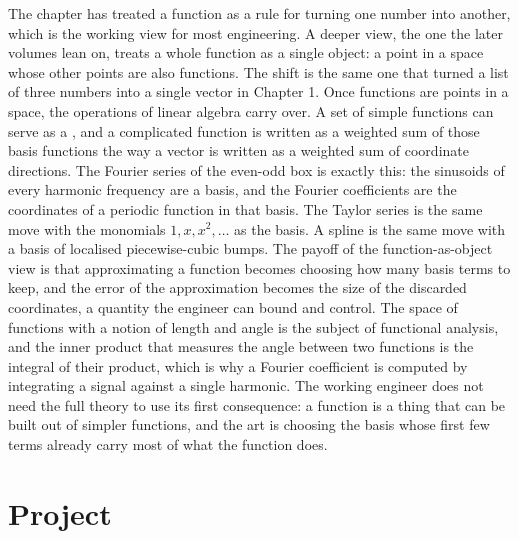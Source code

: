 \begin{mastery}
The chapter has treated a function as a rule for turning one number
into another, which is the working view for most engineering. A deeper
view, the one the later volumes lean on, treats a whole function as a
single object: a point in a space whose other points are also
functions. The shift is the same one that turned a list of three
numbers into a single vector in Chapter 1. Once functions are points
in a space, the operations of linear algebra carry over. A set of
simple functions can serve as a , and a complicated
function is written as a weighted sum of those basis functions the way
a vector is written as a weighted sum of coordinate directions. The
Fourier series of the even-odd box is exactly this: the sinusoids of
every harmonic frequency are a basis, and the Fourier coefficients are
the coordinates of a periodic function in that basis. The Taylor series
is the same move with the monomials $1, x, x^{2}, \ldots$ as the basis.
A spline is the same move with a basis of localised piecewise-cubic
bumps. The payoff of the function-as-object view is that approximating
a function becomes choosing how many basis terms to keep, and the error
of the approximation becomes the size of the discarded coordinates, a
quantity the engineer can bound and control. The space of functions
with a notion of length and angle is the subject of functional
analysis, and the inner product that measures the angle between two
functions is the integral of their product, which is why a Fourier
coefficient is computed by integrating a signal against a single
harmonic. The working engineer does not need the full theory to use
its first consequence: a function is a thing that can be built out of
simpler functions, and the art is choosing the basis whose first few
terms already carry most of what the function does.
\end{mastery}

\section{Project}


